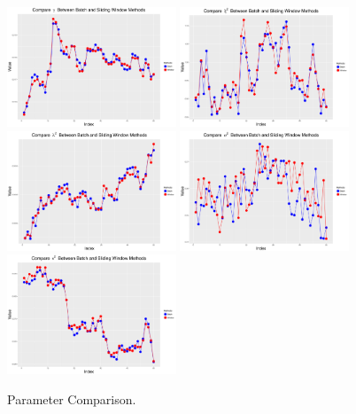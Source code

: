 \begin{figure}[h]
\centering
\includegraphics[width=0.45\textwidth]{Chapters/05MCMCOU/plots/realdatacomparegambatchwindow.pdf}
\includegraphics[width=0.45\textwidth]{Chapters/05MCMCOU/plots/realdatacomparexi2batchwindow.pdf}
\includegraphics[width=0.45\textwidth]{Chapters/05MCMCOU/plots/realdatacomparelab2batchwindow.pdf}
\includegraphics[width=0.45\textwidth]{Chapters/05MCMCOU/plots/realdatacomparesig2batchwindow.pdf}
\includegraphics[width=0.45\textwidth]{Chapters/05MCMCOU/plots/realdatacomparetau2batchwindow.pdf}
\caption{Parameter Comparison. }\label{batchwindowparameter}
\end{figure}



